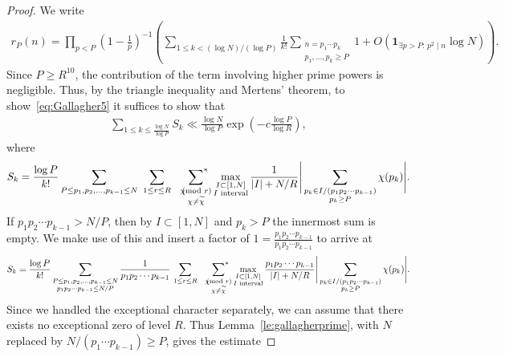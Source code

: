 \documentclass[12pt]{amsart}
\theoremstyle{definition}
\theoremstyle{remark}
\numberwithin{equation}{section}
\newcommand{\asum}{\sideset{}{^{\ast}}\sum}
\newcommand{\1}{\mathbf{1}}
\let\oldpmod\pmod
\renewcommand{\pmod}[1]{\hspace{-0.12cm}\oldpmod {#1}}
\begin{document}
\begin{proof}
    We write
    \begin{align*}
        r_P(n)=\prod_{p< P}\left(1-\frac{1}{p}\right)^{-1} \left(\sum_{1\leq k< (\log N)/(\log P)}\frac{1}{k!}\sum_{\substack{n=p_1\cdots p_k\\p_1,\ldots, p_k\geq P}} 1+O(\1_{\exists p> P\colon\, p^2\mid n} \log N)\right).
    \end{align*}
    Since $P\geq R^{10}$, the contribution of the term involving higher prime powers is negligible. Thus, by the triangle inequality and Mertens' theorem, to show~\eqref{eq:Gallagher5} it suffices to show that
    \begin{align*}
     \sum_{1\leq k \leq \frac{\log N}{\log P}} S_k\ll \frac{\log N}{\log P}\exp\left(-c\frac{\log P }{\log R}\right),   
    \end{align*}
    where
    \begin{align*}
        S_k=\frac{\log P}{k!} \sum_{P\leq p_1,p_2,\ldots, p_{k-1}\leq N}\,\,\sum_{1\leq r\leq R}\quad\asum_{\substack{\chi\pmod r\\\chi\neq \widetilde{\chi}}}\max_{\substack{I\subset [1,N]\\I \textnormal{ interval}\\}}\frac{1}{|I|+N/R} \Bigg|\sum_{\substack{p_{k}\in I/(p_1p_2\cdots p_{k-1})\\ p_k\geq P}}\chi(p_k)\Bigg|.
    \end{align*}
    If $p_1p_2\cdots p_{k-1}>N/P$, then by $I\subset [1,N]$ and $p_k>P$ the innermost sum is empty. We make use of this and insert a factor of $1=\frac{p_1p_2\cdots p_{k-1}}{p_1p_2\cdots p_{k-1}}$ to arrive at
    \begin{align*}
      S_k=  \frac{\log P}{k!} \sum_{\substack{P\leq p_1,p_2,\ldots, p_{k-1}\leq N \\ p_1p_2\cdots p_{k-1}\leq N/P}} \frac{1}{p_1p_2\cdots p_{k-1}}\,\sum_{1\leq r\leq R}\quad\asum_{\substack{\chi\pmod r\\\chi\neq \widetilde{\chi}}}\max_{\substack{I\subset [1,N]\\I \textnormal{ interval}\\}}\frac{p_1p_2\cdots p_{k-1}}{|I|+N/R} \Bigg|\sum_{\substack{p_{k}\in I/(p_1p_2\cdots p_{k-1})\\ p_k\geq P}}\chi(p_k)\Bigg|.
    \end{align*}
     Since we handled the exceptional character separately, we can assume that there exists no exceptional zero of level $R$. Thus Lemma~\ref{le:gallagherprime}, with $N$ replaced by $N/(p_1\cdots p_{k-1})\geq P$, gives the estimate

\end{proof}
\end{document}
